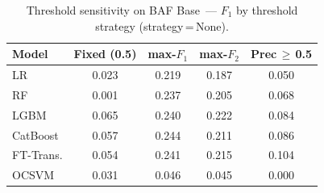 \begin{table}[H]
\centering
\caption{Threshold sensitivity on BAF Base~--- $F_1$ by threshold strategy (strategy\,=\,None).}
\label{tab:threshold_baf_f1}
\begin{tabular}{l c c c c}
\toprule
Model & Fixed (0.5) & max-$F_1$ & max-$F_2$ & Prec\,$\geq$\,0.5 \\
\midrule
LR         & 0.023 & 0.219 & 0.187 & 0.050 \\
RF         & 0.001 & 0.237 & 0.205 & 0.068 \\
LGBM       & 0.065 & 0.240 & 0.222 & 0.084 \\
CatBoost   & 0.057 & 0.244 & 0.211 & 0.086 \\
FT-Trans.  & 0.054 & 0.241 & 0.215 & 0.104 \\
OCSVM      & 0.031 & 0.046 & 0.045 & 0.000 \\
\bottomrule
\end{tabular}
\end{table}